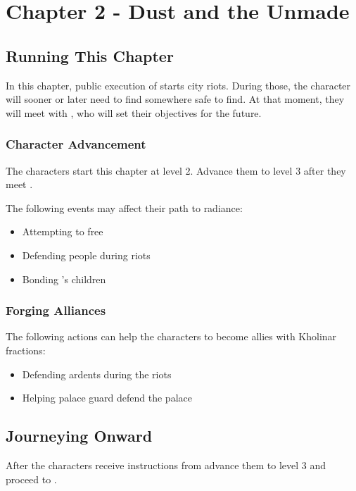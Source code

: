 \chapter{Chapter 2 - Dust and the Unmade}
\label{chap:chapter2}

\setcounter{section}{-1}
\section{Running This Chapter}

In this chapter, public execution of \npcRebelArdent{} starts city riots. During those, the character will sooner or later need to find somewhere safe to find. At that moment, they will meet with \npcSjaAnat{}, who will set their objectives for the future.

\subsection{Character Advancement}

The characters start this chapter at level 2. Advance them to level 3 after they meet \npcSjaAnat{}.

The following events may affect their path to radiance:
\begin{itemize}
	\item Attempting to free \npcRebelArdent{}
	\item Defending people during riots
	\item Bonding \npcSjaAnat{}'s children
\end{itemize}


\subsection{Forging Alliances}

The following actions can help the characters to become allies with Kholinar fractions:
\begin{itemize}
	\item Defending ardents during the riots
	\item Helping palace guard defend the palace
\end{itemize}









\section{Journeying Onward}

After the characters receive instructions from \npcSjaAnat{} advance them to level 3 and proceed to .